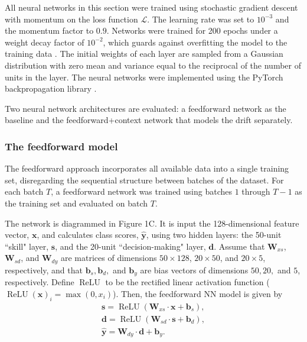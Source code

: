 \documentclass[onecolumn,pre,floats,aps,amsmath,amssymb,superscriptaddress]{revtex4-1}
\DeclareMathOperator{\relu}{ReLU}
\begin{document}
All neural networks in this section were trained using stochastic gradient descent with momentum \cite{rumelhart_learning_1986} on the loss function $\mathcal{L}$. The learning rate was set to $10^{-3}$ and the momentum factor to $0.9$. Networks were trained for 200 epochs under a weight decay factor of $10^{-2}$, which guards against overfitting the model to the training data \cite{pardo_remarks_2004}. The initial weights of each layer are sampled from a Gaussian distribution with zero mean and variance equal to the reciprocal of the number of units in the layer. The neural networks were implemented using the PyTorch backpropagation library \cite{paszke_pytorch_2019}.

Two neural network architectures are evaluated: a feedforward network as the baseline and the feedforward+context network that models the drift separately.

\subsubsection{The feedforward model}
The feedforward approach incorporates all available data into a single training set, disregarding the sequential structure between batches of the dataset. For each batch $T$, a feedforward network was trained using batches $1$ through $T-1$ as the training set and evaluated on batch $T$. 

The network is diagrammed in Figure 1C. It is input the 128-dimensional feature vector, $\mathbf{x}$, and calculates class scores, $\hat{\mathbf{y}}$, using two hidden layers: the 50-unit ``skill" layer, $\mathbf{s}$, and the 20-unit ``decision-making" layer, $\mathbf{d}$. Assume that $\mathbf{W}_{xs}$, $\mathbf{W}_{sd}$, and $\mathbf{W}_{dy}$ are matrices of dimensions $50\times 128$, $20\times 50$, and $20\times 5$, respectively, and that $\mathbf{b}_s, \mathbf{b}_d,$ and $\mathbf{b}_y$ are bias vectors of dimensions $50, 20,$ and $5$, respectively. Define $\relu$ to be the rectified linear activation function ($\relu(\mathbf{x})_i = \max(0, x_i)$). Then, the feedforward NN model is given by
\begin{equation}
\begin{split}
\mathbf{s}=\relu(\mathbf{W}_{xs}\cdot\mathbf{x}+\mathbf{b}_s), \\
\mathbf{d}=\relu(\mathbf{W}_{sd}\cdot\mathbf{s}+\mathbf{b}_d), \\
\hat{\mathbf{y}}=\mathbf{W}_{dy}\cdot\mathbf{d}+\mathbf{b}_y.
\end{split}
\end{equation}
\end{document}
